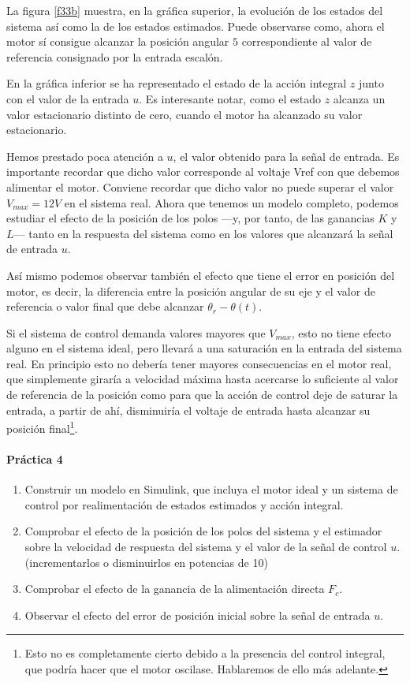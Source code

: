 \documentclass[10pt,a4paper]{report}
\begin{document}
La figura \ref{f33b} muestra, en la gráfica superior, la evolución de los estados del sistema así como la de los estados estimados. Puede observarse como, ahora el motor sí consigue alcanzar la posición angular $5$ correspondiente al valor de referencia consignado por la entrada escalón.

En la gráfica inferior se ha representado el estado de la  acción integral $z$ junto con el valor de la entrada $u$. Es interesante notar, como el estado $z$ alcanza un valor estacionario distinto de cero, cuando el motor ha alcanzado su valor estacionario.

Hemos prestado poca atención a $u$, el valor obtenido para la señal de entrada. Es importante recordar que dicho valor corresponde al voltaje Vref con que debemos alimentar el motor.  Conviene recordar que dicho valor no puede superar el valor $V_{max}=12V$ en el sistema real. Ahora que tenemos un modelo completo, podemos estudiar el efecto de la posición de los polos ---y, por tanto, de las ganancias $K$ y $L$--- tanto en la respuesta del sistema como en los valores que alcanzará la señal de entrada $u$. 

Así mismo podemos observar también el efecto que tiene el error en posición del motor, es decir, la diferencia entre la posición angular de su eje y el valor de referencia o valor final que debe alcanzar $\theta_r-\theta(t)$.

Si el sistema de control demanda valores mayores que $V_{max}$, esto no tiene efecto alguno en el sistema ideal, pero llevará a una saturación en la entrada del sistema real. En principio esto no debería tener mayores consecuencias en el motor real, que simplemente giraría a velocidad máxima hasta acercarse lo suficiente al valor de referencia de la posición como para que la acción de control deje de saturar la entrada, a partir de ahí, disminuiría el voltaje de entrada hasta alcanzar su posición final\footnote{Esto no es completamente cierto debido a la presencia del control integral, que podría hacer que el motor oscilase. Hablaremos de ello más adelante.}.
  
\paragraph{Práctica 4}
\begin{enumerate}
\item Construir un modelo en Simulink, que incluya el motor ideal y un sistema de control por realimentación de estados estimados y acción integral. 
\item Comprobar el efecto de la posición de los polos del sistema y el estimador sobre la velocidad de respuesta del sistema y el valor de la señal de control $u$. (incrementarlos o disminuirlos en potencias de 10)
\item Comprobar el efecto de la ganancia de la alimentación directa $F_c$.
\item Observar el efecto del error de posición inicial sobre la señal de entrada $u$. 
\end{enumerate}
\end{document}
